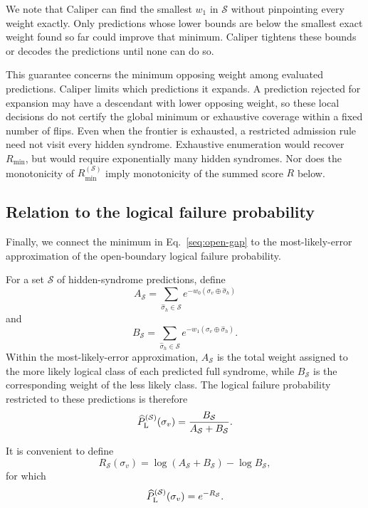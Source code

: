 \documentclass[
    reprint,
    amsmath,amssymb,
    nofootinbib,
    superscriptaddress,
    aps,
    noeprint,
    longbibliography,
    prl
]{revtex4-2}
\theoremstyle{plain}
\begin{document}
We note that Caliper can find the smallest $w_1$ in $\mathcal S$ without pinpointing every
weight exactly. Only predictions whose lower bounds are below the smallest exact weight
found so far could improve that minimum. Caliper tightens these bounds or decodes the
predictions until none can do so.

This guarantee concerns the minimum opposing weight among evaluated predictions. Caliper limits
which predictions it expands. A prediction rejected for
expansion may have a descendant with lower opposing weight, so these local decisions do not certify
the global minimum or exhaustive coverage within a fixed number of flips. Even when the frontier
is exhausted, a restricted admission rule need not visit every hidden syndrome. Exhaustive enumeration would
recover $R_{\min}$, but would require exponentially many hidden syndromes. Nor does the monotonicity of
$R_{\min}^{(\mathcal S)}$ imply monotonicity of the summed score $R$ below.

\subsection{Relation to the logical failure probability}

Finally, we connect the minimum in Eq.~\eqref{seq:open-gap} to the most-likely-error approximation
of the open-boundary logical failure probability.

For a set $\mathcal S$ of hidden-syndrome predictions, define
\begin{equation}
    A_{\mathcal S}
    =
    \sum_{\hat\sigma_h\in\mathcal S}
    e^{-w_0(\sigma_v\oplus\hat\sigma_h)}
\end{equation}
and
\begin{equation}
    B_{\mathcal S}
    =
    \sum_{\hat\sigma_h\in\mathcal S}
    e^{-w_1(\sigma_v\oplus\hat\sigma_h)}.
\end{equation}
Within the most-likely-error approximation, $A_{\mathcal S}$ is the total weight assigned to the
more likely logical class of each predicted full syndrome, while $B_{\mathcal S}$ is the corresponding
weight of the less likely class. The logical failure probability restricted to these predictions is
therefore
\begin{equation}
    \widehat P_{\rm L}^{(\mathcal S)}(\sigma_v)
    =
    \frac{B_{\mathcal S}}
    {A_{\mathcal S}+B_{\mathcal S}}.
    \label{seq:restricted-failure}
\end{equation}

It is convenient to define
\begin{equation}
    R_{\mathcal S}(\sigma_v)
    =
    \log(A_{\mathcal S}+B_{\mathcal S})-\log B_{\mathcal S},
    \label{seq:aggregate-score}
\end{equation}
for which
\begin{equation}
    \widehat P_{\rm L}^{(\mathcal S)}(\sigma_v)
    =
    e^{-R_{\mathcal S}}.
    \label{seq:aggregate-probability}
\end{equation}
\end{document}
